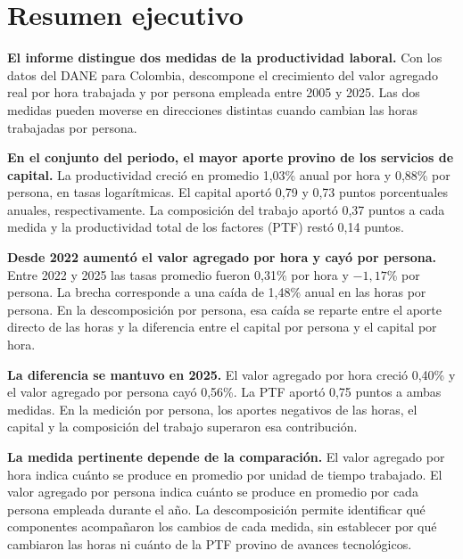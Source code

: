 \section*{Resumen ejecutivo}

\textbf{El informe distingue dos medidas de la productividad laboral.} Con los datos del DANE para Colombia, descompone el crecimiento del valor agregado real por hora trabajada y por persona empleada entre 2005 y 2025. Las dos medidas pueden moverse en direcciones distintas cuando cambian las horas trabajadas por persona.

\textbf{En el conjunto del periodo, el mayor aporte provino de los servicios de capital.} La productividad creció en promedio 1,03\% anual por hora y 0,88\% por persona, en tasas logarítmicas. El capital aportó 0,79 y 0,73 puntos porcentuales anuales, respectivamente. La composición del trabajo aportó 0,37 puntos a cada medida y la productividad total de los factores (PTF) restó 0,14 puntos.

\textbf{Desde 2022 aumentó el valor agregado por hora y cayó por persona.} Entre 2022 y 2025 las tasas promedio fueron 0,31\% por hora y $-1{,}17$\% por persona. La brecha corresponde a una caída de 1,48\% anual en las horas por persona. En la descomposición por persona, esa caída se reparte entre el aporte directo de las horas y la diferencia entre el capital por persona y el capital por hora.

\textbf{La diferencia se mantuvo en 2025.} El valor agregado por hora creció 0,40\% y el valor agregado por persona cayó 0,56\%. La PTF aportó 0,75 puntos a ambas medidas. En la medición por persona, los aportes negativos de las horas, el capital y la composición del trabajo superaron esa contribución.

\textbf{La medida pertinente depende de la comparación.} El valor agregado por hora indica cuánto se produce en promedio por unidad de tiempo trabajado. El valor agregado por persona indica cuánto se produce en promedio por cada persona empleada durante el año. La descomposición permite identificar qué componentes acompañaron los cambios de cada medida, sin establecer por qué cambiaron las horas ni cuánto de la PTF provino de avances tecnológicos.
\clearpage

